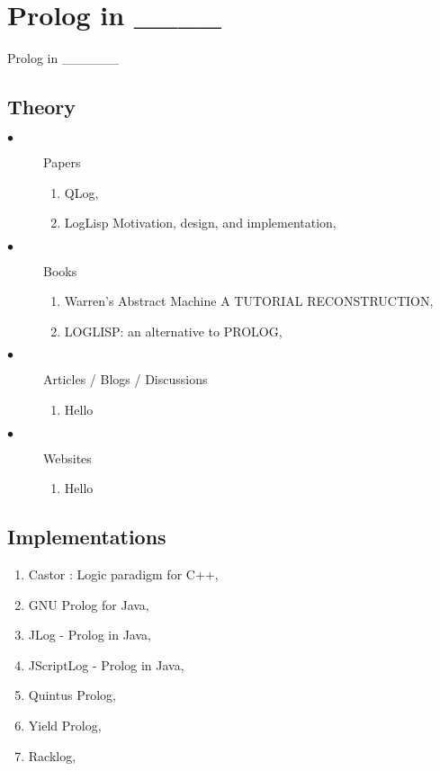 \documentclass[proposal.tex]{subfiles}
\begin{document}
\chapter{Prolog in \_\_\_\_ }\label{chap:prologin}

Prolog in \_\_\_\_\_\_
\section{Theory}
\begin{description}

\item[$\bullet$] Papers
\begin{enumerate}
\item QLog, \cite{komorowski1982qlog}
\item LogLisp Motivation, design, and implementation, \cite{robinson1982loglisp} 
\end{enumerate}

\item[$\bullet$] Books
\begin{enumerate}
\item Warren’s Abstract Machine A TUTORIAL RECONSTRUCTION, \cite{ait1999warren}
\item LOGLISP: an alternative to PROLOG, \cite{robinson1980loglisp}
\end{enumerate}

\item[$\bullet$] Articles / Blogs / Discussions
\begin{enumerate}
\item Hello
\end{enumerate}


\item[$\bullet$] Websites
\begin{enumerate}
\item Hello
\end{enumerate}

\end{description}

\section{Implementations}
\begin{enumerate}
\item Castor : Logic paradigm for C++, \cite{castorc++}
\item GNU Prolog for Java, \cite{gnuprolog}
\item JLog - Prolog in Java, \cite{jlog}
\item JScriptLog - Prolog in Java, \cite{jscriptlog}
\item  Quintus Prolog, \cite{quintusprolog}
\item Yield Prolog, \cite{yieldprolog}
\item Racklog, \cite{racklog}
\end{enumerate}
\end{document}
